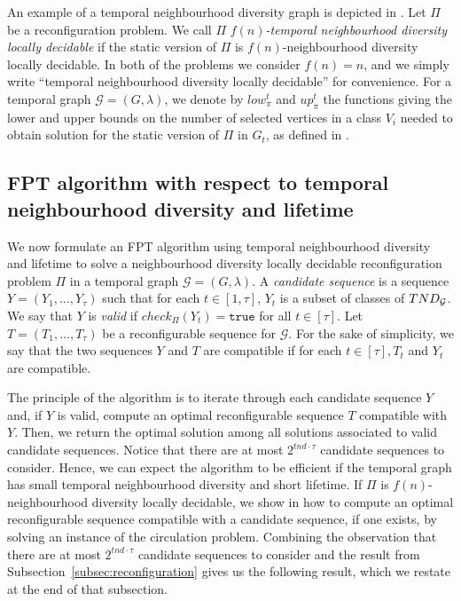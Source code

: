 An example of a temporal neighbourhood diversity graph is depicted in .
%
Let $\Pi$ be a reconfiguration problem. We call $\Pi$ \emph{$f(n)$-temporal neighbourhood diversity locally decidable} if the static version of $\Pi$ is $f(n)$-neighbourhood diversity locally decidable. In both of the problems we consider $f(n)=n$, and we simply write ``temporal neighbourhood diversity locally decidable'' for convenience. For a temporal graph $\mathcal{G}=(G,\lambda)$, we denote by $low^t_\pi$ and $up^t_\pi$ the functions giving the lower and upper bounds on the number of selected vertices in a class $V_i$ needed to obtain solution for the static version of $\Pi$ in $G_t$, as defined in .


\subsection{FPT algorithm with respect to temporal neighbourhood diversity and lifetime}
\label{subsec:algo}

We now formulate an FPT algorithm using temporal neighbourhood diversity and lifetime to solve a neighbourhood diversity locally decidable reconfiguration problem $\Pi$ in a temporal graph $\mathcal{G}=(G,\lambda)$. 
A \emph{candidate sequence} is a sequence $Y = (Y_1,\dots,Y_\tau)$ such that for each $t \in [1,\tau]$, $Y_t$ is a subset of classes of $TND_{\mathcal{G}}$. 
We say that $Y$ is \emph{valid} if $check_\Pi(Y_t)= \texttt{true}$ for all $t \in [\tau]$. Let $T=(T_1,\dots,T_\tau)$ be a reconfigurable sequence for $\mathcal{G}$. For the sake of simplicity, we say that the two sequences $Y$ and $T$ are compatible if for each $t \in [\tau], T_t$ and $Y_t$ are compatible. 

The principle of the algorithm is to iterate through each candidate sequence $Y$ and, if $Y$ is valid, compute an optimal reconfigurable sequence $T$ compatible with $Y$. Then, we return the optimal solution among all solutions associated to valid candidate sequences.
Notice that there are at most $2^{tnd \cdot\tau}$ candidate sequences to consider. Hence, we can expect the algorithm to be efficient if the temporal graph has small temporal neighbourhood diversity and short lifetime.
If $\Pi$ is $f(n)$-neighbourhood diversity locally decidable, we show in  how to compute an optimal reconfigurable sequence compatible with a candidate sequence, if one exists, by solving an instance of the circulation problem. Combining the observation that there are at most $2^{tnd \cdot\tau}$ candidate sequences to consider and the result from Subsection~\ref{subsec:reconfiguration} gives us the following result, which we restate at the end of that subsection.

